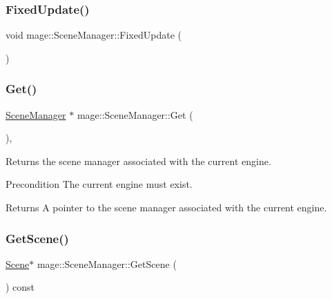 \subsubsection{\texorpdfstring{Fixed\+Update()}{FixedUpdate()}}
{\footnotesize\ttfamily void mage\+::\+Scene\+Manager\+::\+Fixed\+Update (\begin{DoxyParamCaption}{ }\end{DoxyParamCaption})}

\hypertarget{classmage_1_1_scene_manager_a282dbbea100d7de48c0b0876619db5e7}{}\label{classmage_1_1_scene_manager_a282dbbea100d7de48c0b0876619db5e7} 
\subsubsection{\texorpdfstring{Get()}{Get()}}
{\footnotesize\ttfamily \hyperlink{classmage_1_1_scene_manager}{Scene\+Manager} $\ast$ mage\+::\+Scene\+Manager\+::\+Get (\begin{DoxyParamCaption}{ }\end{DoxyParamCaption})\hspace{0.3cm}{\ttfamily [static]}, {\ttfamily [noexcept]}}

Returns the scene manager associated with the current engine.

\begin{DoxyPrecond}{Precondition}
The current engine must exist. 
\end{DoxyPrecond}
\begin{DoxyReturn}{Returns}
A pointer to the scene manager associated with the current engine. 
\end{DoxyReturn}
\hypertarget{classmage_1_1_scene_manager_a55d720c9f90cfc46dbf07d46537072c1}{}\label{classmage_1_1_scene_manager_a55d720c9f90cfc46dbf07d46537072c1} 
\subsubsection{\texorpdfstring{Get\+Scene()}{GetScene()}}
{\footnotesize\ttfamily \hyperlink{classmage_1_1_scene}{Scene}$\ast$ mage\+::\+Scene\+Manager\+::\+Get\+Scene (\begin{DoxyParamCaption}{ }\end{DoxyParamCaption}) const\hspace{0.3cm}{\ttfamily [noexcept]}}

